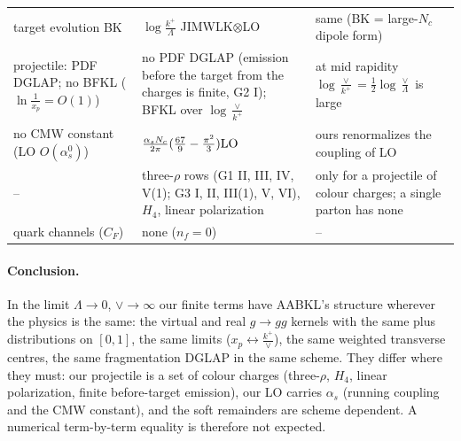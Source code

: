 \documentclass[10pt]{article}
\numberwithin{equation}{section}
\newcommand{\LO}{{\rm LO}}
\begin{document}
{\begin{longtable}{@{}>{\raggedright\arraybackslash}p{}>{\raggedright\arraybackslash}p{}>{\raggedright\arraybackslash}p{}@{}}
target evolution BK & $\log\frac{k^+}{\Lambda}$ JIMWLK$\otimes$LO & same (BK = large-$N_c$ dipole form)\\
projectile: PDF DGLAP; no BFKL ($\ln\frac1{x_p}=O(1)$) & no PDF DGLAP (emission before the target from the charges is finite, G2 I); BFKL over $\log\frac{\vee}{k^+}$ & at mid rapidity $\log\frac\vee{k^+}=\frac12\log\frac\vee\Lambda$ is large\\
no CMW constant (LO $O(\alpha_s^0)$) & $\frac{\alpha_sN_c}{2\pi}(\frac{67}{9}-\frac{\pi^2}{3})\LO$ & ours renormalizes the coupling of LO\\
-- & three-$\rho$ rows (G1 II, III, IV, V(1); G3 I, II, III(1), V, VI), $H_4$, linear polarization & only for a projectile of colour charges; a single parton has none\\
quark channels ($C_F$) & none ($n_f=0$) & --\\\bottomrule
\end{longtable}}
\paragraph{Conclusion.} In the limit $\Lambda\to0$, $\vee\to\infty$ our finite terms have AABKL's structure wherever the physics is the same: the virtual and real $g\to gg$ kernels with the same plus distributions on $[0,1]$, the same limits ($x_p\leftrightarrow\frac{k^+}{\vee}$), the same weighted transverse centres, the same fragmentation DGLAP in the same scheme. They differ where they must: our projectile is a set of colour charges (three-$\rho$, $H_4$, linear polarization, finite before-target emission), our LO carries $\alpha_s$ (running coupling and the CMW constant), and the soft remainders are scheme dependent. A numerical term-by-term equality is therefore not expected.



\appendix
\end{document}
